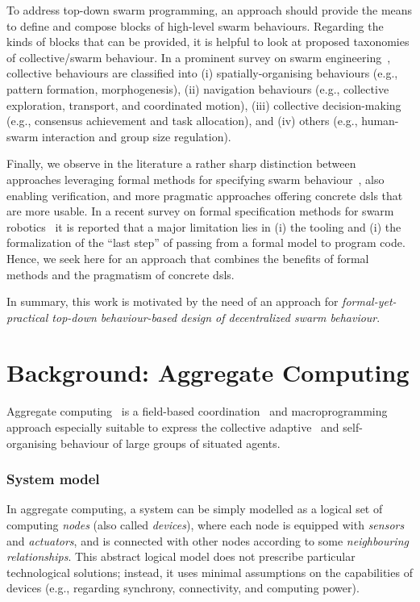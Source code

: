 To address %
 top-down swarm programming,
 an approach should provide
 the means to define and compose 
 blocks of high-level swarm behaviours.%
%
Regarding the kinds of blocks that can be provided,
 it is helpful to look at proposed taxonomies of collective/swarm behaviour.
%
In a prominent survey on swarm engineering~\cite{DBLP:journals/swarm/BrambillaFBD13},
 collective behaviours are classified into 
 (i) spatially-organising behaviours (e.g., pattern formation, morphogenesis),
 (ii) navigation behaviours (e.g., collective exploration, transport, and coordinated motion),
 (iii) collective decision-making (e.g., consensus achievement and task allocation),
 and
 (iv) others (e.g., human-swarm interaction and group size regulation).

Finally, we observe in the literature 
 a rather sharp distinction
 between approaches leveraging
 formal methods for specifying swarm behaviour~\cite{DBLP:journals/csur/LuckcuckFDDF19},
 also enabling verification,
 and more pragmatic approaches
 offering concrete \acp{dsl} 
 that are more usable.
%
In a recent survey on formal specification methods for swarm robotics~\cite{DBLP:journals/csur/LuckcuckFDDF19}
 it is reported that a major limitation lies in (i) the tooling and (i) the formalization of the ``last step'' of passing from a formal model to program code.
%
Hence, we seek here for an approach that combines the benefits of formal methods and the pragmatism of concrete \acp{dsl}.

In summary,
 this work is motivated by the need of an
 approach for \emph{formal-yet-practical top-down behaviour-based design of decentralized swarm behaviour}.

\section{Background: Aggregate Computing}\label{sec:background} %

Aggregate computing~\cite{DBLP:journals/jlap/ViroliBDACP19}
 is a field-based coordination~\cite{Mamei:2004a} and macroprogramming~\cite{Casadei2023} approach
 especially suitable to express
 the collective adaptive~\cite{DBLP:journals/sttt/NicolaJW20} and self-organising behaviour 
 of large groups of situated agents.
 
\subsubsection{System model}
%
In aggregate computing,
 a system can be simply modelled as a logical set of computing \emph{nodes} (also called \emph{devices}),
 where each node is 
 equipped with \emph{sensors} and \emph{actuators},
 and is  
 connected with other nodes
 according to some \emph{neighbouring relationships}.
%
%
This abstract logical model does not prescribe 
 particular technological solutions;
 instead,
 it uses minimal assumptions on the capabilities of devices (e.g., regarding synchrony, connectivity, and computing power).

